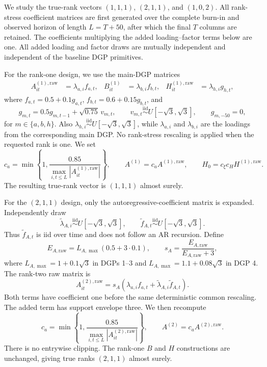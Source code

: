 \documentclass[11pt]{article}
\numberwithin{equation}{section}
\theoremstyle{remark}
\begin{document}
We study the true-rank vectors $(1,1,1)$, $(2,1,1)$, and
$(1,0,2)$.  All rank-stress coefficient matrices are first generated over
the complete burn-in and observed horizon of length $L=T+50$, after which
the final $T$ columns are retained.  The coefficients multiplying the added loading--factor terms below are one.
All added loading and factor draws are mutually independent and independent
of the baseline DGP primitives.

For the rank-one design, we use the main-DGP matrices
\begin{align*}
 A_{it}^{(1),\mathrm{raw}}&=\lambda_{a,i}f_{a,t}, &
 B_{it}^{(1)}&=\lambda_{b,i}f_{b,t}, &
 H_{it}^{(1),\mathrm{raw}}&=\lambda_{h,i}g_{h,t},
\end{align*}
where $f_{a,t}=0.5+0.1g_{a,t}$,
$f_{b,t}=0.6+0.15g_{b,t}$, and
\[
 g_{m,t}=0.5g_{m,t-1}+\sqrt{0.75}\,v_{m,t},\qquad
 v_{m,t}\stackrel{\mathrm{iid}}{\sim}U[-\sqrt{3},\sqrt{3}],
 \qquad g_{m,-50}=0,
\]
for $m\in\{a,b,h\}$.  Also
$\lambda_{h,i}\stackrel{\mathrm{iid}}{\sim}U[-\sqrt{3},\sqrt{3}]$,
while $\lambda_{a,i}$ and $\lambda_{b,i}$ are the loadings from the
corresponding main DGP.  No rank-stress rescaling is applied when the
requested rank is one.  We set
\[
 c_a=\min\left\{1,
 \frac{0.85}{\max_{i,t\leq L}|A_{it}^{(1),\mathrm{raw}}|}\right\},
 \qquad A^{(1)}=c_aA^{(1),\mathrm{raw}},
 \qquad H_0=c_\xi c_H H^{(1),\mathrm{raw}}.
\]
The resulting true-rank vector is $(1,1,1)$ almost surely.

For the $(2,1,1)$ design, only the autoregressive-coefficient matrix is
expanded.  Independently draw
\[
 \widetilde\lambda_{A,i}\stackrel{\mathrm{iid}}{\sim}
 U[-\sqrt{3},\sqrt{3}],\qquad
 \widetilde f_{A,t}\stackrel{\mathrm{iid}}{\sim}
 U[-\sqrt{3},\sqrt{3}].
\]
Thus $\widetilde f_{A,t}$ is iid over time and does not follow an AR
recursion.  Define
\[
 E_{A,\mathrm{raw}}
 =L_{A,\max}(0.5+3\cdot0.1),\qquad
 s_A=\frac{E_{A,\mathrm{raw}}}{E_{A,\mathrm{raw}}+3},
\]
where $L_{A,\max}=1+0.1\sqrt{3}$ in DGPs 1--3 and
$L_{A,\max}=1.1+0.08\sqrt{3}$ in DGP 4.  The rank-two raw matrix is
\[
 A_{it}^{(2),\mathrm{raw}}
 =s_A\left(\lambda_{a,i}f_{a,t}
 +\widetilde\lambda_{A,i}\widetilde f_{A,t}\right).
\]
Both terms have coefficient one before the same deterministic common
rescaling.  The added term has support envelope three.  We then recompute
\[
 c_a=\min\left\{1,
 \frac{0.85}{\max_{i,t\leq L}|A_{it}^{(2),\mathrm{raw}}|}\right\},
 \qquad A^{(2)}=c_aA^{(2),\mathrm{raw}}.
\]
There is no entrywise clipping.  The rank-one $B$ and $H$ constructions
are unchanged, giving true ranks $(2,1,1)$ almost surely.
\end{document}
